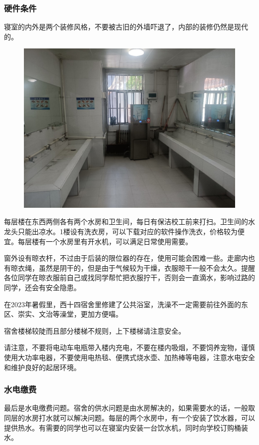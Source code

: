 \documentclass[
decoration,  %
]{qyxf-book}
\begin{document}
	\subsubsection{硬件条件}

	寝室的内外是两个装修风格，不要被古旧的外墙吓退了，内部的装修仍然是现代的。

	\begin{figure}[!h]
		\centering
		\includegraphics[width=0.8\linewidth]{pics/chp2_west10_dorm_wc}
	\end{figure}
	
	每层楼在东西两侧各有两个水房和卫生间，每日有保洁校工前来打扫。卫生间的水龙头只能出凉水。1楼设有洗衣房，可以下载对应的软件操作洗衣，价格较为便宜。每层楼有一个水房里有开水机，可以满足日常使用需要。
	
	窗外设有晾衣杆，不过由于后装的限位器的存在，使用可能会困难一些。走廊内也有晾衣绳，虽然是阴干的，但是由于气候较为干燥，衣服晾干一般不会太久。提醒各位同学在晾衣服前自己或找同学帮忙把衣服拧干，否则会一直滴水，影响过路的同学，还会有安全隐患。

	在2023年暑假里，西十四宿舍里修建了公共浴室，洗澡不一定需要前往外面的东区、崇实、文治等澡堂，更加方便喵。
	
	宿舍楼梯较陡而且部分楼梯不规则，上下楼梯请注意安全。

	请注意，不要将电动车电瓶带入楼内充电，不要在楼内吸烟，不要饲养宠物，谨慎使用大功率电器，不要使用电热毯、便携式烧水壶、加热棒等电器，注意水电安全和维护良好的起居环境。

	
	\subsubsection{水电缴费}
	最后是水电缴费问题。宿舍的供水问题是由水房解决的，如果需要水的话，一般取同层的水房打水就可以解决问题。每层的两个水房中，有一个安装了饮水器，可以提供热水。有需要的同学也可以在寝室内安装一台饮水机，同时向学校订购桶装水。
	
\end{document}
